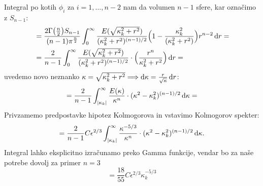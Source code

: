 \documentclass[mat2, tisk]{fmfdelo}
\begin{document}
Integral po kotih $\phi_i$ za $i = 1, \dots, n-2$ nam da volumen $n-1$ sfere, kar
označimo z $S_{n-1}$:
\begin{align*}
&= \frac{2 \Gamma\big(\frac{n}{2}\big) S_{n-1}}{(n-1)\pi^\frac{n}{2}} \int_{0}^\infty \frac{E(\sqrt{\kappa_k^2 + r^2})}{(\kappa_k^2 + r^2)^{(n-1)/2}}\Big(1 - \frac{\kappa_k^2}{(\kappa_k^2 + r^2)}\Big) r^{n-2} \dif r = \\
&= \frac{2}{n-1} \int_{0}^\infty \frac{E(\sqrt{\kappa_k^2 + r^2})}{(\kappa_k^2 + r^2)^{(n-1)/2}}\cdot\Big(\frac{r^n}{\kappa_k^2 + r^2}\Big) \dif r = 
\end{align*}
uvedemo novo neznanko $\kappa = \sqrt{\kappa_k^2 + r^2} \Longrightarrow \dif \kappa = \frac{r}{\sqrt{\kappa}} \dif r$: 
\begin{align*}
= \frac{2}{n-1} \int_{|\kappa_k|}^{\infty} \frac{E(\kappa)}{\kappa^{n}}\cdot (\kappa^2 - \kappa_k^2)^{(n-1)/2} \dif \kappa = 
\end{align*}
Privzamemo predpostavke hipotez Kolmogorova in vstavimo Kolmogorov spekter: 
\begin{align*}
= \frac{2}{n-1} C \epsilon^{2/3} \int_{|\kappa_k|}^{\infty} \frac{\kappa^{-5/3}}{\kappa^{n}}\cdot (\kappa^2 - \kappa_k^2)^{(n-1)/2} \dif \kappa.
\end{align*}
Integral lahko eksplicitno izračunamo preko Gamma funkcije, vendar 
bo za naše potrebe dovolj za primer $n=3$
$$
= \frac{18}{55} C \epsilon^{2/3} \kappa_k^{-5/3}
$$
\end{document}
